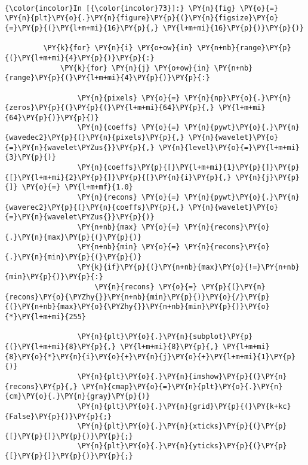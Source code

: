     \begin{center}
    \end{center}
    { \hspace*{\fill} \\}
    
    \begin{Verbatim}[commandchars=\\\{\}]
{\color{incolor}In [{\color{incolor}73}]:} \PY{n}{fig} \PY{o}{=} \PY{n}{plt}\PY{o}{.}\PY{n}{figure}\PY{p}{(}\PY{n}{figsize}\PY{o}{=}\PY{p}{(}\PY{l+m+mi}{16}\PY{p}{,} \PY{l+m+mi}{16}\PY{p}{)}\PY{p}{)}
         
         \PY{k}{for} \PY{n}{i} \PY{o+ow}{in} \PY{n+nb}{range}\PY{p}{(}\PY{l+m+mi}{4}\PY{p}{)}\PY{p}{:}
             \PY{k}{for} \PY{n}{j} \PY{o+ow}{in} \PY{n+nb}{range}\PY{p}{(}\PY{l+m+mi}{4}\PY{p}{)}\PY{p}{:}
         
                 \PY{n}{pixels} \PY{o}{=} \PY{n}{np}\PY{o}{.}\PY{n}{zeros}\PY{p}{(}\PY{p}{(}\PY{l+m+mi}{64}\PY{p}{,} \PY{l+m+mi}{64}\PY{p}{)}\PY{p}{)}
                 \PY{n}{coeffs} \PY{o}{=} \PY{n}{pywt}\PY{o}{.}\PY{n}{wavedec2}\PY{p}{(}\PY{n}{pixels}\PY{p}{,} \PY{n}{wavelet}\PY{o}{=}\PY{n}{wavelet\PYZus{}}\PY{p}{,} \PY{n}{level}\PY{o}{=}\PY{l+m+mi}{3}\PY{p}{)}
                 \PY{n}{coeffs}\PY{p}{[}\PY{l+m+mi}{1}\PY{p}{]}\PY{p}{[}\PY{l+m+mi}{2}\PY{p}{]}\PY{p}{[}\PY{n}{i}\PY{p}{,} \PY{n}{j}\PY{p}{]} \PY{o}{=} \PY{l+m+mf}{1.0}
                 \PY{n}{recons} \PY{o}{=} \PY{n}{pywt}\PY{o}{.}\PY{n}{waverec2}\PY{p}{(}\PY{n}{coeffs}\PY{p}{,} \PY{n}{wavelet}\PY{o}{=}\PY{n}{wavelet\PYZus{}}\PY{p}{)}
                 \PY{n+nb}{max} \PY{o}{=} \PY{n}{recons}\PY{o}{.}\PY{n}{max}\PY{p}{(}\PY{p}{)}
                 \PY{n+nb}{min} \PY{o}{=} \PY{n}{recons}\PY{o}{.}\PY{n}{min}\PY{p}{(}\PY{p}{)}
                 \PY{k}{if}\PY{p}{(}\PY{n+nb}{max}\PY{o}{!=}\PY{n+nb}{min}\PY{p}{)}\PY{p}{:}
                     \PY{n}{recons} \PY{o}{=} \PY{p}{(}\PY{n}{recons}\PY{o}{\PYZhy{}}\PY{n+nb}{min}\PY{p}{)}\PY{o}{/}\PY{p}{(}\PY{n+nb}{max}\PY{o}{\PYZhy{}}\PY{n+nb}{min}\PY{p}{)}\PY{o}{*}\PY{l+m+mi}{255}
                     
                 \PY{n}{plt}\PY{o}{.}\PY{n}{subplot}\PY{p}{(}\PY{l+m+mi}{8}\PY{p}{,} \PY{l+m+mi}{8}\PY{p}{,} \PY{l+m+mi}{8}\PY{o}{*}\PY{n}{i}\PY{o}{+}\PY{n}{j}\PY{o}{+}\PY{l+m+mi}{1}\PY{p}{)}
                 \PY{n}{plt}\PY{o}{.}\PY{n}{imshow}\PY{p}{(}\PY{n}{recons}\PY{p}{,} \PY{n}{cmap}\PY{o}{=}\PY{n}{plt}\PY{o}{.}\PY{n}{cm}\PY{o}{.}\PY{n}{gray}\PY{p}{)}
                 \PY{n}{plt}\PY{o}{.}\PY{n}{grid}\PY{p}{(}\PY{k+kc}{False}\PY{p}{)}\PY{p}{;}
                 \PY{n}{plt}\PY{o}{.}\PY{n}{xticks}\PY{p}{(}\PY{p}{[}\PY{p}{]}\PY{p}{)}\PY{p}{;}
                 \PY{n}{plt}\PY{o}{.}\PY{n}{yticks}\PY{p}{(}\PY{p}{[}\PY{p}{]}\PY{p}{)}\PY{p}{;}
\end{Verbatim}


